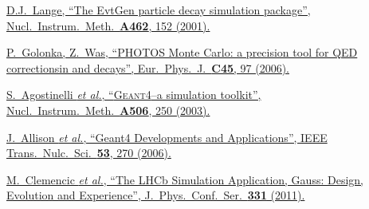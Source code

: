 \href{https://doi.org/10.1016/S0168-9002(01)00089-4}{D.J.~Lange, \enquote{The EvtGen particle decay simulation package}, Nucl.\ Instrum.\ Meth.\ \textbf{A462}, 152 (2001).}

\href{https://doi.org/10.1140/epjc/s2005-02396-4}{P.~Golonka, Z.~Was, \enquote{PHOTOS Monte Carlo: a precision tool for QED correctionsin \PZ and \PW decays}, Eur.\ Phys.\ J.\ \textbf{C45}, 97 (2006).}

\href{https://doi.org/10.1016/S0168-9002(03)01368-8}{S.~Agostinelli \textit{et al.}, \enquote{\textsc{Geant4}--a simulation toolkit}, Nucl.\ Instrum.\ Meth.\ \textbf{A506}, 250 (2003).}

\href{https://doi.org/10.1109/TNS.2006.869826}{J.~Allison \textit{et al.}, \enquote{Geant4 Developments and Applications}, IEEE Trans.\ Nulc.\ Sci.\ \textbf{53}, 270 (2006).}

\href{https://doi.org/10.1088/1742-6596/331/3/032023}{M.~Clemencic \textit{et al.}, \enquote{The LHCb Simulation Application, Gauss: Design, Evolution and Experience}, J.\ Phys.\ Conf.\ Ser.\ \textbf{331} (2011).}

